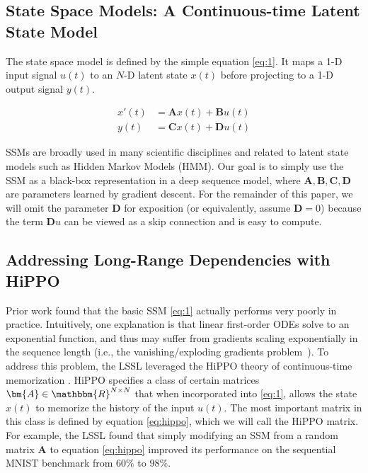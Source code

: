 \subsection{State Space Models: A Continuous-time Latent State Model}
\label{sec:ss-continuous}

The state space model is defined by the simple equation \eqref{eq:1}.
It maps a 1-D input signal $u(t)$ to an \( N \)-D latent state \( x(t) \)
before projecting to a 1-D output signal \( y(t) \).

\begin{equation}
  \label{eq:1}
  \begin{aligned}
    x'(t) &= \bm{A}x(t) + \bm{B}u(t) \\
    y(t) &= \bm{C}x(t) + \bm{D}u(t)
  \end{aligned}
\end{equation}

SSMs are broadly used in many scientific disciplines and related to latent state models such as Hidden Markov Models (HMM). Our goal is to simply use the SSM as a black-box representation in a deep sequence model, where $\bm{A}, \bm{B}, \bm{C}, \bm{D}$ are parameters learned by gradient descent. For the remainder of this paper, we will omit the parameter \( \bm{D} \) for exposition (or equivalently, assume \( \bm{D} = 0 \)) because the term \( \bm{D}u \) can be viewed as a skip connection and is easy to compute.

\subsection{Addressing Long-Range Dependencies with HiPPO}
\label{sec:ss-memory}

Prior work found that the basic SSM \eqref{eq:1} actually performs very poorly in practice. Intuitively, one explanation is that linear first-order ODEs solve to an exponential function, and thus may suffer from gradients scaling exponentially in the sequence length (i.e., the vanishing/exploding gradients problem~\citep{pascanu2013difficulty}). To address this problem, the LSSL leveraged the HiPPO theory of continuous-time memorization \citep{gu2020hippo}. HiPPO specifies a class of certain matrices \( \bm{A} \in \mathbbm{R}^{N \times N} \) that when incorporated into \eqref{eq:1}, allows the state \( x(t) \) to memorize the history of the input \( u(t) \).
The most important matrix in this class is defined by equation \eqref{eq:hippo},
which we will call the HiPPO matrix. For example, the LSSL found that simply modifying an SSM from a random matrix \( \bm{A} \) to equation \eqref{eq:hippo} improved its performance on the sequential MNIST benchmark from \( 60\% \) to \( 98\% \).

